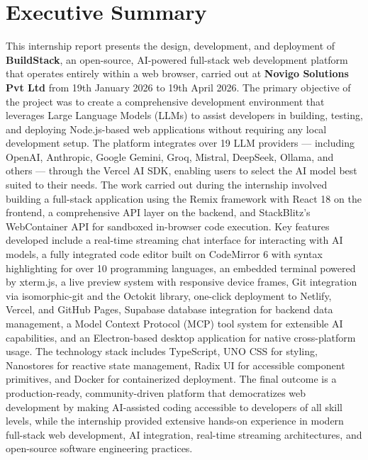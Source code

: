 \documentclass[12pt,a4paper,openany]{report}
\begin{document}
\newpage
\pagestyle{plain}
\chapter*{Executive Summary}

This internship report presents the design, development, and deployment of \textbf{BuildStack}, an open-source, AI-powered full-stack web development platform that operates entirely within a web browser, carried out at \textbf{Novigo Solutions Pvt Ltd} from 19th January 2026 to 19th April 2026. The primary objective of the project was to create a comprehensive development environment that leverages Large Language Models (LLMs) to assist developers in building, testing, and deploying Node.js-based web applications without requiring any local development setup. The platform integrates over 19 LLM providers --- including OpenAI, Anthropic, Google Gemini, Groq, Mistral, DeepSeek, Ollama, and others --- through the Vercel AI SDK, enabling users to select the AI model best suited to their needs. The work carried out during the internship involved building a full-stack application using the Remix framework with React 18 on the frontend, a comprehensive API layer on the backend, and StackBlitz's WebContainer API for sandboxed in-browser code execution. Key features developed include a real-time streaming chat interface for interacting with AI models, a fully integrated code editor built on CodeMirror 6 with syntax highlighting for over 10 programming languages, an embedded terminal powered by xterm.js, a live preview system with responsive device frames, Git integration via isomorphic-git and the Octokit library, one-click deployment to Netlify, Vercel, and GitHub Pages, Supabase database integration for backend data management, a Model Context Protocol (MCP) tool system for extensible AI capabilities, and an Electron-based desktop application for native cross-platform usage. The technology stack includes TypeScript, UNO CSS for styling, Nanostores for reactive state management, Radix UI for accessible component primitives, and Docker for containerized deployment. The final outcome is a production-ready, community-driven platform that democratizes web development by making AI-assisted coding accessible to developers of all skill levels, while the internship provided extensive hands-on experience in modern full-stack web development, AI integration, real-time streaming architectures, and open-source software engineering practices.
\end{document}

